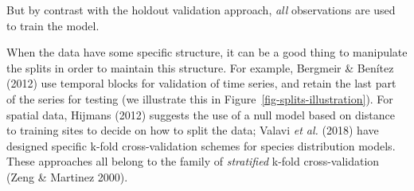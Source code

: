 \documentclass[
  letterpaper,
]{scrbook}
\begin{document}
But by contrast with the holdout validation approach, \emph{all}
observations are used to train the model.

When the data have some specific structure, it can be a good thing to
manipulate the splits in order to maintain this structure. For example,
Bergmeir \& Benítez (2012) use temporal blocks for validation of time
series, and retain the last part of the series for testing (we
illustrate this in Figure~\ref{fig-splits-illustration}). For spatial
data, Hijmans (2012) suggests the use of a null model based on distance
to training sites to decide on how to split the data; Valavi \emph{et
al.} (2018) have designed specific k-fold cross-validation schemes for
species distribution models. These approaches all belong to the family
of \emph{stratified} k-fold cross-validation (Zeng \& Martinez 2000).

\begin{figure}[bt]



\end{figure}%
\end{document}
